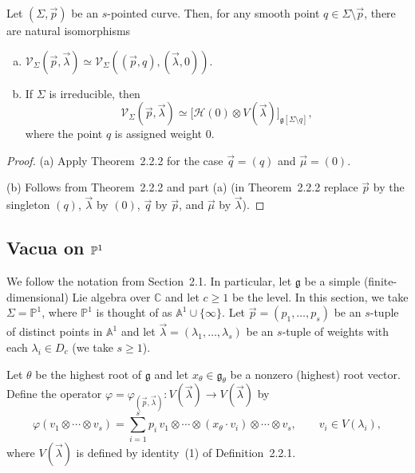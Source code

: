 \documentclass[12pt]{article}
\begin{document}
\begin{corollary}[Corollary~2.2.3]
    Let $(\Sigma,\vec p)$ be an $s$-pointed curve.
    Then, for any smooth point $q\in\Sigma\setminus\vec p$, there are natural isomorphisms
    \begin{enumerate}[(a)]
        \item
              $\mathcal V_{\Sigma}(\vec p,\vec\lambda)
                  \simeq
                  \mathcal V_{\Sigma}((\vec p,q),(\vec\lambda,0))$.
        \item
              If $\Sigma$ is irreducible, then
              \[
                  \mathcal V_{\Sigma}(\vec p,\vec\lambda)
                  \simeq
                  \bigl[\mathcal H(0)\otimes V(\vec\lambda)\bigr]_{\mathfrak g[\Sigma\setminus q]},
              \]
              where the point $q$ is assigned weight $0$.
    \end{enumerate}
\end{corollary}

\begin{proof}
    (a) Apply Theorem~2.2.2 for the case $\vec q=(q)$ and $\vec\mu=(0)$.

    (b) Follows from Theorem~2.2.2 and part (a)
    (in Theorem~2.2.2 replace $\vec p$ by the singleton $(q)$,
    $\vec\lambda$ by $(0)$,
    $\vec q$ by $\vec p$,
    and $\vec\mu$ by $\vec\lambda$).
\end{proof}

\subsection{Vacua on $\P^1$}
We follow the notation from Section~2.1. In particular, let $\mathfrak g$ be a simple (finite-dimensional) Lie algebra over $\mathbb{C}$ and let $c \ge 1$ be the level.
In this section, we take $\Sigma = \mathbb{P}^1$, where $\mathbb{P}^1$ is thought of as $\mathbb{A}^1 \cup \{\infty\}$.
Let $\vec{p} = (p_1,\dots,p_s)$ be an $s$-tuple of distinct points in $\mathbb{A}^1$ and let
$\vec{\lambda} = (\lambda_1,\dots,\lambda_s)$ be an $s$-tuple of weights with each $\lambda_i \in D_c$ (we take $s \ge 1$).

\begin{definition}[{\bf 2.3.1}]
    Let $\theta$ be the highest root of $\mathfrak g$ and let $x_\theta \in \mathfrak g_\theta$ be a nonzero (highest) root vector.
    Define the operator $\varphi = \varphi_{(\vec{p},\vec{\lambda})} : V(\vec{\lambda}) \to V(\vec{\lambda})$ by
    \[
        \varphi(v_1 \otimes \cdots \otimes v_s)
        = \sum_{i=1}^s p_i\,v_1 \otimes \cdots \otimes (x_\theta \cdot v_i) \otimes \cdots \otimes v_s,
        \qquad v_i \in V(\lambda_i),
    \]
    where $V(\vec{\lambda})$ is defined by identity~(1) of Definition~2.2.1.
\end{definition}
\end{document}
